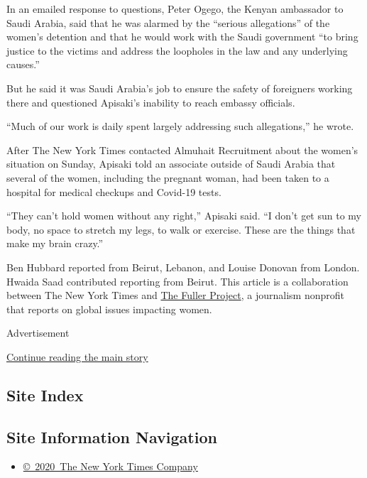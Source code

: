 In an emailed response to questions, Peter Ogego, the Kenyan ambassador
to Saudi Arabia, said that he was alarmed by the ``serious allegations''
of the women's detention and that he would work with the Saudi
government ``to bring justice to the victims and address the loopholes
in the law and any underlying causes.''

But he said it was Saudi Arabia's job to ensure the safety of foreigners
working there and questioned Apisaki's inability to reach embassy
officials.

``Much of our work is daily spent largely addressing such allegations,''
he wrote.

After The New York Times contacted Almuhait Recruitment about the
women's situation on Sunday, Apisaki told an associate outside of Saudi
Arabia that several of the women, including the pregnant woman, had been
taken to a hospital for medical checkups and Covid-19 tests.

``They can't hold women without any right,'' Apisaki said. ``I don't get
sun to my body, no space to stretch my legs, to walk or exercise. These
are the things that make my brain crazy.''

Ben Hubbard reported from Beirut, Lebanon, and Louise Donovan from
London. Hwaida Saad contributed reporting from Beirut. This article is a
collaboration between The New York Times and
\href{https://fullerproject.org/}{The Fuller Project}, a journalism
nonprofit that reports on global issues impacting women.

Advertisement

\protect\hyperlink{after-bottom}{Continue reading the main story}

\hypertarget{site-index}{%
\subsection{Site Index}\label{site-index}}

\hypertarget{site-information-navigation}{%
\subsection{Site Information
Navigation}\label{site-information-navigation}}

\begin{itemize}
\tightlist
\item
  \href{https://help.nytimes3xbfgragh.onion/hc/en-us/articles/115014792127-Copyright-notice}{©~2020~The
  New York Times Company}
\end{itemize}

